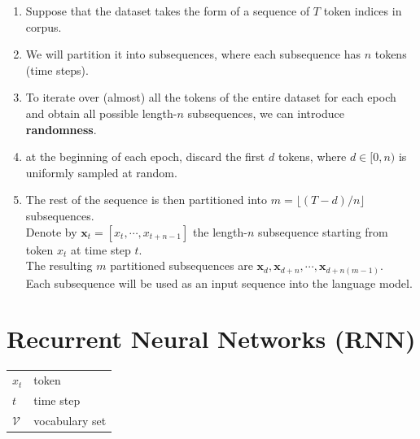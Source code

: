 \begin{enumerate}
    \item Suppose that the dataset takes the form of a sequence of $T$ token indices in corpus. 
    
    \item We will partition it into subsequences, where each subsequence has $n$ tokens (time steps).

    \item To iterate over (almost) all the tokens of the entire dataset for each epoch and obtain all possible length-$n$ subsequences, we can introduce \textbf{randomness}.

    \item at the beginning of each epoch, discard the first $d$ tokens, where $d\in [0,n)$ is uniformly sampled at random.

    \item The rest of the sequence is then partitioned into $m=\lfloor (T-d)/n \rfloor$ subsequences.\\
    Denote by $\mathbf x_t = [x_t, \cdots, x_{t+n-1}]$ the length-$n$ subsequence starting from token $x_t$ at time step $t$.\\
    The resulting $m$ partitioned subsequences are $\mathbf x_d, \mathbf x_{d+n}, \cdots, \mathbf x_{d+n(m-1)}$.\\
    Each subsequence will be used as an input sequence into the language model.

\end{enumerate}








\section{Recurrent Neural Networks (RNN) \cite{dnn-1}} \label{Recurrent Neural Networks (RNN)}

\begin{customTableWrapper}{1.5}
\begin{table}[H]
    \centering
    \begin{tabular}{l p{8cm}}
        $x_t$ & token \\
        $t$ & time step \\
        $\mathcal{V}$ & vocabulary set \\
        
    \end{tabular}
\end{table}
\end{customTableWrapper}


